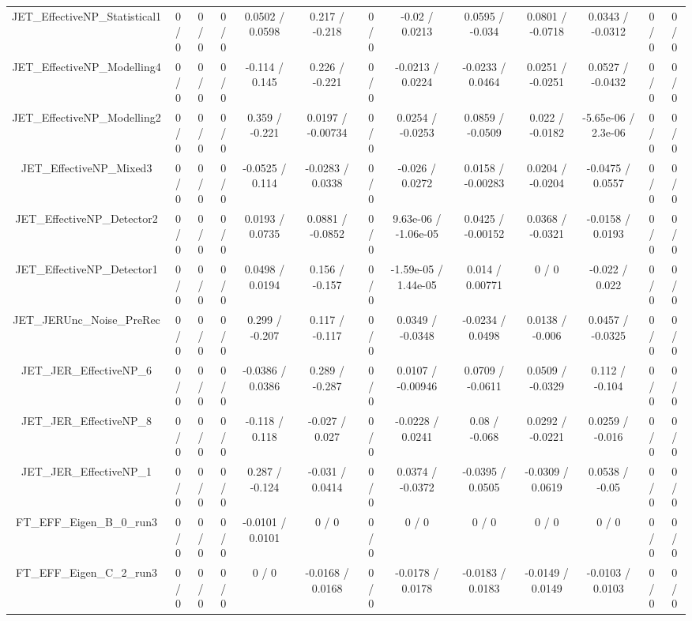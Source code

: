 \documentclass[10pt]{article}
\begin{document}
\begin{table}[htbp]
\begin{center}
\begin{tabular}{|c|c|c|c|c|c|c|c|c|c|c|c|c|}
  JET_EffectiveNP_Statistical1 & 0 / 0 & 0 / 0 & 0 / 0 & 0.0502 / 0.0598 & 0.217 / -0.218 & 0 / 0 & -0.02 / 0.0213 & 0.0595 / -0.034 & 0.0801 / -0.0718 & 0.0343 / -0.0312 & 0 / 0 & 0 / 0 \\ 
  JET_EffectiveNP_Modelling4 & 0 / 0 & 0 / 0 & 0 / 0 & -0.114 / 0.145 & 0.226 / -0.221 & 0 / 0 & -0.0213 / 0.0224 & -0.0233 / 0.0464 & 0.0251 / -0.0251 & 0.0527 / -0.0432 & 0 / 0 & 0 / 0 \\ 
  JET_EffectiveNP_Modelling2 & 0 / 0 & 0 / 0 & 0 / 0 & 0.359 / -0.221 & 0.0197 / -0.00734 & 0 / 0 & 0.0254 / -0.0253 & 0.0859 / -0.0509 & 0.022 / -0.0182 & -5.65e-06 / 2.3e-06 & 0 / 0 & 0 / 0 \\ 
  JET_EffectiveNP_Mixed3 & 0 / 0 & 0 / 0 & 0 / 0 & -0.0525 / 0.114 & -0.0283 / 0.0338 & 0 / 0 & -0.026 / 0.0272 & 0.0158 / -0.00283 & 0.0204 / -0.0204 & -0.0475 / 0.0557 & 0 / 0 & 0 / 0 \\ 
  JET_EffectiveNP_Detector2 & 0 / 0 & 0 / 0 & 0 / 0 & 0.0193 / 0.0735 & 0.0881 / -0.0852 & 0 / 0 & 9.63e-06 / -1.06e-05 & 0.0425 / -0.00152 & 0.0368 / -0.0321 & -0.0158 / 0.0193 & 0 / 0 & 0 / 0 \\ 
  JET_EffectiveNP_Detector1 & 0 / 0 & 0 / 0 & 0 / 0 & 0.0498 / 0.0194 & 0.156 / -0.157 & 0 / 0 & -1.59e-05 / 1.44e-05 & 0.014 / 0.00771 & 0 / 0 & -0.022 / 0.022 & 0 / 0 & 0 / 0 \\ 
  JET_JERUnc_Noise_PreRec & 0 / 0 & 0 / 0 & 0 / 0 & 0.299 / -0.207 & 0.117 / -0.117 & 0 / 0 & 0.0349 / -0.0348 & -0.0234 / 0.0498 & 0.0138 / -0.006 & 0.0457 / -0.0325 & 0 / 0 & 0 / 0 \\ 
  JET_JER_EffectiveNP_6 & 0 / 0 & 0 / 0 & 0 / 0 & -0.0386 / 0.0386 & 0.289 / -0.287 & 0 / 0 & 0.0107 / -0.00946 & 0.0709 / -0.0611 & 0.0509 / -0.0329 & 0.112 / -0.104 & 0 / 0 & 0 / 0 \\ 
  JET_JER_EffectiveNP_8 & 0 / 0 & 0 / 0 & 0 / 0 & -0.118 / 0.118 & -0.027 / 0.027 & 0 / 0 & -0.0228 / 0.0241 & 0.08 / -0.068 & 0.0292 / -0.0221 & 0.0259 / -0.016 & 0 / 0 & 0 / 0 \\ 
  JET_JER_EffectiveNP_1 & 0 / 0 & 0 / 0 & 0 / 0 & 0.287 / -0.124 & -0.031 / 0.0414 & 0 / 0 & 0.0374 / -0.0372 & -0.0395 / 0.0505 & -0.0309 / 0.0619 & 0.0538 / -0.05 & 0 / 0 & 0 / 0 \\ 
  FT_EFF_Eigen_B_0_run3 & 0 / 0 & 0 / 0 & 0 / 0 & -0.0101 / 0.0101 & 0 / 0 & 0 / 0 & 0 / 0 & 0 / 0 & 0 / 0 & 0 / 0 & 0 / 0 & 0 / 0 \\ 
  FT_EFF_Eigen_C_2_run3 & 0 / 0 & 0 / 0 & 0 / 0 & 0 / 0 & -0.0168 / 0.0168 & 0 / 0 & -0.0178 / 0.0178 & -0.0183 / 0.0183 & -0.0149 / 0.0149 & -0.0103 / 0.0103 & 0 / 0 & 0 / 0 \\ 

\end{tabular}
\end{center}
\end{table}
\end{document}
